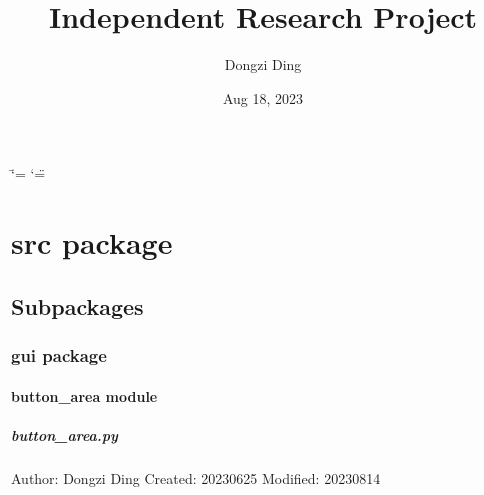 \documentclass[a4paper,10pt,english]{sphinxmanual}
\title{Independent Research Project}
\date{Aug 18, 2023}
\author{Dongzi Ding}
\begin{document}
\ifdefined\shorthandoff
  \ifnum\catcode`\=\string=\active\shorthandoff{=}\fi
  \ifnum\catcode`\"=\active{}\fi
\fi

\pagestyle{empty}
\sphinxmaketitle
\pagestyle{plain}
\sphinxtableofcontents
\pagestyle{normal}
\label{\detokenize{index::doc}}


\sphinxstepscope


\chapter{src package}
\label{\detokenize{src:module-src}}\label{\detokenize{src:src-package}}\label{\detokenize{src::doc}}

\section{Subpackages}
\label{\detokenize{src:subpackages}}
\sphinxstepscope


\subsection{gui package}
\label{\detokenize{gui:module-src.gui}}\label{\detokenize{gui:gui-package}}\label{\detokenize{gui::doc}}

\subsubsection{button\_area module}
\label{\detokenize{gui:module-src.gui.button_area}}\label{\detokenize{gui:button-area-module}}

\paragraph{button\_area.py}
\label{\detokenize{gui:button-area-py}}
\sphinxAtStartPar
Author: Dongzi Ding
Created: 2023\sphinxhyphen{}06\sphinxhyphen{}25
Modified: 2023\sphinxhyphen{}08\sphinxhyphen{}14
\end{document}
